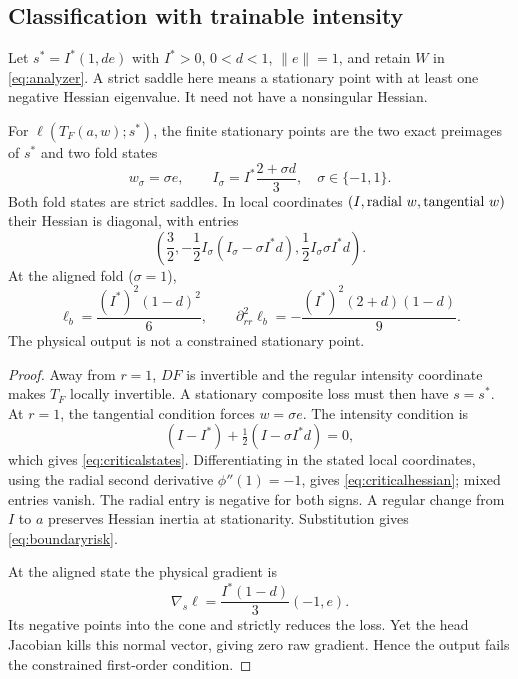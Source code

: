 \subsection{Classification with trainable intensity}
Let $s^*=I^*(1,de)$ with $I^*>0$, $0<d<1$, $\|e\|=1$, and retain $W$ in \eqref{eq:analyzer}. A strict saddle here means a stationary point with at least one negative Hessian eigenvalue. It need not have a nonsingular Hessian.

\begin{theorem}
\label{thm:classification}
For $\ell(T_F(a,w);s^*)$, the finite stationary points are the two exact preimages of $s^*$ and two fold states
\begin{equation}
 w_\sigma=\sigma e,\qquad I_\sigma=I^*\frac{2+\sigma d}{3},
 \quad\sigma\in\{-1,1\}.
 \label{eq:criticalstates}
\end{equation}
Both fold states are strict saddles. In local coordinates $(I,\hbox{radial }w,\hbox{tangential }w)$ their Hessian is diagonal, with entries
\begin{equation}
 \left(\frac32,
 -\frac12 I_\sigma(I_\sigma-\sigma I^*d),
 \frac12 I_\sigma\sigma I^*d\right).
 \label{eq:criticalhessian}
\end{equation}
At the aligned fold ($\sigma=1$),
\begin{equation}
 \ell_b=\frac{(I^*)^2(1-d)^2}{6},\qquad
 \partial_{rr}^2\ell_b=-\frac{(I^*)^2(2+d)(1-d)}9.
 \label{eq:boundaryrisk}
\end{equation}
The physical output is not a constrained stationary point.
\end{theorem}
\begin{proof}
Away from $r=1$, $DF$ is invertible and the regular intensity coordinate makes $T_F$ locally invertible. A stationary composite loss must then have $s=s^*$. At $r=1$, the tangential condition forces $w=\sigma e$. The intensity condition is
\begin{equation*}
 (I-I^*)+\tfrac12(I-\sigma I^*d)=0,
\end{equation*}
which gives \eqref{eq:criticalstates}. Differentiating in the stated local coordinates, using the radial second derivative $\phi''(1)=-1$, gives \eqref{eq:criticalhessian}; mixed entries vanish. The radial entry is negative for both signs. A regular change from $I$ to $a$ preserves Hessian inertia at stationarity. Substitution gives \eqref{eq:boundaryrisk}.

At the aligned state the physical gradient is
\begin{equation*}
 \nabla_s\ell=\frac{I^*(1-d)}3(-1,e).
\end{equation*}
Its negative points into the cone and strictly reduces the loss. Yet the head Jacobian kills this normal vector, giving zero raw gradient. Hence the output fails the constrained first-order condition.
\end{proof}
